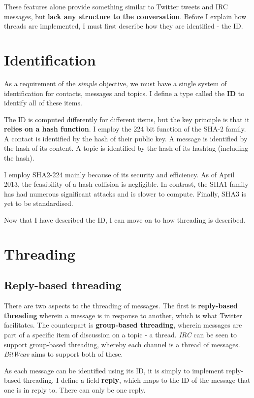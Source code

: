 \documentclass[10pt,a4paper,onecolumn]{article}
\begin{document}
These features alone provide something similar to Twitter tweets and IRC messages, but \textbf{lack any structure to the conversation}. Before I explain how threads are implemented, I must first describe how they are identified - the ID.

\section{Identification}
As a requirement of the \emph{simple} objective, we must have a single system of identification for contacts, messages and topics. I define a type called the \textbf{ID} to identify all of these items. 

The ID is computed differently for different items, but the key principle is that it \textbf{relies on a hash function}. I employ the 224 bit function of the SHA-2 family. A contact is identified by the hash of their public key. A message is identified by the hash of its content. A topic is identified by the hash of its hashtag (including the hash). 

I employ SHA2-224 mainly because of its security and efficiency. As of April 2013, the feasibility of a hash collision is negligible. In contrast, the SHA1 family has had numerous significant attacks and is slower to compute. Finally, SHA3 is yet to be standardised. 

Now that I have described the ID, I can move on to how threading is described.

\section{Threading}
\subsection*{Reply-based threading}
There are two aspects to the threading of messages. The first is \textbf{reply-based threading} wherein a message is in response to another, which is what Twitter facilitates. The counterpart is \textbf{group-based threading}, wherein messages are part of a specific item of discussion on a topic - a thread. \textit{IRC} can be seen to support group-based threading, whereby each channel is a thread of messages. \textit{BitWeav} aims to support both of these. 

As each message can be identified using its ID, it is simply to implement reply-based threading. I define a field \textbf{reply}, which maps to the ID of the message that one is in reply to. There can only be one reply. 
\end{document}
